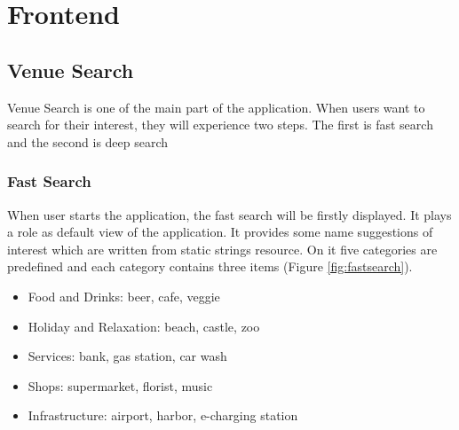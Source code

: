 \section{Frontend}
\label{sec:frontend}

\subsection{Venue Search}
Venue Search is one of the main part of the application. When users want to search for their interest, they will experience two steps. The first is fast search and the second is deep search
\subsubsection{Fast Search}
When user starts the application, the fast search will be firstly displayed. It plays a role as default view of the application. It provides some name suggestions of interest which are written from static strings resource. On it five categories are predefined and each category contains three items (Figure \ref{fig:fastsearch}).
\begin{itemize}
	 \item Food and Drinks: beer, cafe, veggie
	 \item Holiday and Relaxation: beach, castle, zoo
	 \item Services: bank, gas station, car wash
	 \item Shops: supermarket, florist, music
	 \item Infrastructure: airport, harbor, e-charging station
\end{itemize}

